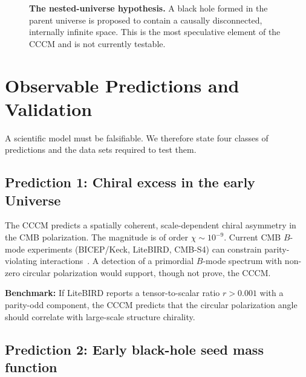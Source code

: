 \documentclass[a4paper,11pt]{article}
\newcommand{\CCCM}{CCCM}
\begin{document}
\begin{figure}[htbp]
\centering
{}
\caption{\textbf{The nested-universe hypothesis.} A black hole formed in the parent universe is proposed to contain a causally disconnected, internally infinite space. This is the most speculative element of the \CCCM{} and is not currently testable.}
\label{fig:nested}
\end{figure}

\section{Observable Predictions and Validation}
\label{sec:predictions}

A scientific model must be falsifiable. We therefore state four classes of predictions and the data sets required to test them.

\subsection{Prediction 1: Chiral excess in the early Universe}

The \CCCM{} predicts a spatially coherent, scale-dependent chiral asymmetry in the CMB polarization. The magnitude is of order $\chi \sim 10^{-9}$. Current CMB $B$-mode experiments (BICEP/Keck, LiteBIRD, CMB-S4) can constrain parity-violating interactions~\cite{Matsumura2023}. A detection of a primordial $B$-mode spectrum with non-zero circular polarization would support, though not prove, the \CCCM.

\textbf{Benchmark:} If LiteBIRD reports a tensor-to-scalar ratio $r > 0.001$ with a parity-odd component, the \CCCM{} predicts that the circular polarization angle should correlate with large-scale structure chirality.

\subsection{Prediction 2: Early black-hole seed mass function}
\end{document}
